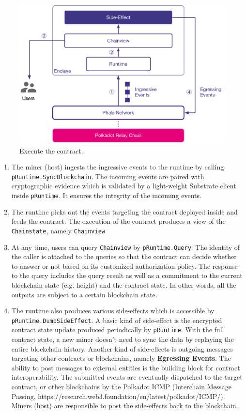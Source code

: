 \begin{figure}
    \centering \footnotesize
    \includegraphics[width=.7\columnwidth]{img/pLIBRA-execute}
    \caption{Execute the contract.}
    \label{fig:contract-execution}
\end{figure}

\begin{enumerate}
    \item The miner (host) ingests the ingressive events to the runtime by calling \texttt{pRuntime.SyncBlockchain}. The incoming events are paired with cryptographic evidence which is validated by a light-weight Substrate client inside \texttt{pRuntime}. It ensures the integrity of the incoming events.
    \item The runtime picks out the events targeting the contract deployed inside and feeds the contract. The execution of the contract produces a view of the \texttt{Chainstate}, namely \texttt{Chainview}
    \item At any time, users can query \texttt{Chainview} by \texttt{pRuntime.Query}. The identity of the caller is attached to the queries so that the contract can decide whether to answer or not based on its customized authorization policy. The response to the query includes the query result as well as a commitment to the current blockchain state (e.g. height) and the contract state. In other words, all the outputs are subject to a certain blockchain state.
    \item The runtime also produces various side-effects which is accessible by \texttt{pRuntime.DumpSideEffect}. A basic kind of side-effect is the encrypted contract state update produced periodically by \texttt{pRuntime}. With the full contract state, a new miner doesn't need to sync the data by replaying the entire blockchain history. Another kind of side-effects is outgoing messages targeting other contracts or blockchains, namely \textbf{Egressing Events}. The ability to post messages to external entities is the building block for contract interoperability. The submitted events are eventually dispatched to the target contract, or other blockchains by the Polkadot ICMP (Interchain Message Passing, https://research.web3.foundation/en/latest/polkadot/ICMP/). Miners (host) are responsible to post the side-effects back to the blockchain.
\end{enumerate}

